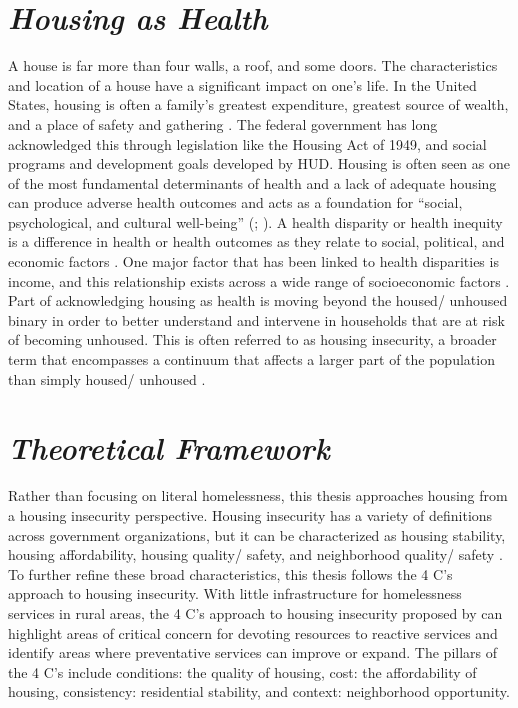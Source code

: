 \section{\textit{Housing as Health}}
A house is far more than four walls, a roof, and some doors. The characteristics and location of a house have a significant impact on one’s life. In the United States, housing is often a family’s greatest expenditure, greatest source of wealth, and a place of safety and gathering \citep{braveman_housing_2011}. The federal government has long acknowledged this through legislation like the Housing Act of 1949, and social programs and development goals developed by HUD. Housing is often seen as one of the most fundamental determinants of health and a lack of adequate housing can produce adverse health outcomes and acts as a foundation for “social, psychological, and cultural well-being” (\citealp[p.17]{dalessandro_housing_2020}; \citealp{leifheit_building_2022}).  A health disparity or health inequity is a difference in health or health outcomes as they relate to social, political, and economic factors \citep{lutfiyya_rurality_2012}. One major factor that has been linked to health disparities is income, and this relationship exists across a wide range of socioeconomic factors \citep{canto_rural_2014}.  Part of acknowledging housing as health is moving beyond the housed/ unhoused binary in order to better understand and intervene in households that are at risk of becoming unhoused. This is often referred to as housing insecurity, a broader term that encompasses a continuum that affects a larger part of the population than simply housed/ unhoused \citep{deluca_housing_2022}.

\section{\textit{Theoretical Framework}}

Rather than focusing on literal homelessness, this thesis approaches housing from a housing insecurity perspective. Housing insecurity has a variety of definitions across government organizations, but it can be characterized as housing stability, housing affordability, housing quality/ safety, and neighborhood quality/ safety \citep{cox_road_2019}. To further refine these broad characteristics, this thesis follows the 4 C's approach to housing insecurity. With little infrastructure for homelessness services in rural areas, the 4 C’s approach to housing insecurity proposed by \citet{swope_housing_2020} can highlight areas of critical concern for devoting resources to reactive services and identify areas where preventative services can improve or expand. The pillars of the 4 C's include conditions: the quality of housing, cost: the affordability of housing, consistency: residential stability, and context: neighborhood opportunity.

